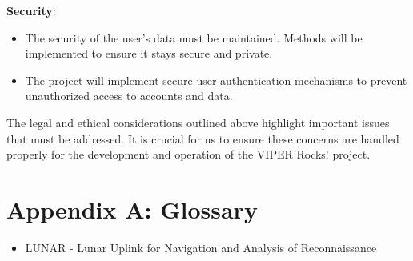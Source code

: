 \documentclass{article}
\begin{document}
\textbf{Security}: 
\begin{itemize}
	\item The security of the user’s data must be maintained. Methods will be implemented to ensure it stays secure and private.
	\item The project will implement secure user authentication mechanisms to prevent unauthorized access to accounts and data. 
\end{itemize}
The legal and ethical considerations outlined above highlight important issues that must be addressed. It is crucial for us to ensure these concerns are handled properly for the development and operation of the VIPER Rocks! project.

\section{Appendix A: Glossary}
\begin{itemize}
	\item LUNAR - Lunar Uplink for Navigation and Analysis of Reconnaissance
\end{itemize}
\end{document}

